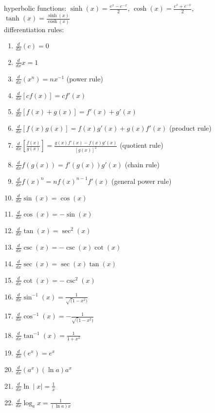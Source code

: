 \documentclass{article}
\begin{document}
hyperbolic functions: $\sinh(x) = \frac{e^x-e^{-x}}{2}$, $\cosh(x) = \frac{e^x+e^{-x}}{2}$, $\tanh(x) = \frac{\sinh(x)}{\cosh(x)}$\\

differentiation rules:
	\begin{enumerate}
		\item$\frac{d}{dx}(c) = 0$
		\item$\frac{d}{dx}x = 1$
		\item$\frac{d}{dx}(x^n) = nx^{-1}$ (power rule)
		\item$\frac{d}{dx}[cf(x)] = cf'(x)$
		\item$\frac{d}{dx}[f(x)+g(x)] = f'(x) + g'(x)$
		\item$\frac{d}{dx}[f(x)g(x)] = f(x)g'(x) + g(x)f'(x)$ (product rule)
		\item$\frac{d}{dx}[\frac{f(x)}{g(x)}] = \frac{g(x)f'(x) - f(x)g'(x)}{[g(x)]^2}$ (quotient rule)
		\item$\frac{d}{dx}f(g(x)) = f'(g(x))g'(x)$ (chain rule)
		\item$\frac{d}{dx}f(x)^n = nf(x)^{n-1}f'(x)$ (general power rule)
		\item$\frac{d}{dx}\sin(x) = \cos(x)$ 
		\item$\frac{d}{dx}\cos(x) = -\sin(x)$
		\item$\frac{d}{dx}\tan(x) = \sec^2(x)$
		\item$\frac{d}{dx}\csc(x) = -\csc(x)\cot(x)$
		\item$\frac{d}{dx}\sec(x) = \sec(x)\tan(x)$
		\item$\frac{d}{dx}\cot(x) = -\csc^2(x)$
		\item$\frac{d}{dx}\sin^{-1}(x) = \frac{1}{\sqrt(1 - x^2)}$
		\item$\frac{d}{dx}\cos^{-1}(x) = -\frac{1}{\sqrt(1 - x^2)}$
		\item$\frac{d}{dx}\tan^{-1}(x) = \frac{1}{1 + x^2}$
		\item$\frac{d}{dx}(e^x) = e^x$
		\item$\frac{d}{dx}(a^x) (\ln a)a^x$
		\item$\frac{d}{dx}\ln\mid x\mid = \frac{1}{x}$
		\item$\frac{d}{dx}\log_ax = \frac{1}{(\ln a)x}$
	\end{enumerate}
\end{document}
